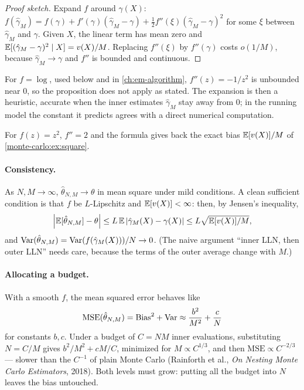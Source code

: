 \begin{notechapter}
\begin{proof}[Proof sketch]
Expand $f$ around $\gamma(X)$:
$f(\hat\gamma_M) = f(\gamma) + f'(\gamma)(\hat\gamma_M - \gamma) + \frac12f''(\xi)(\hat\gamma_M - \gamma)^2$
for some $\xi$ between $\hat\gamma_M$ and $\gamma$. Given $X$, the linear term
has mean zero and $\mathbb{E}[(\hat\gamma_M - \gamma)^2\mid X] = v(X)/M$. Replacing
$f''(\xi)$ by $f''(\gamma)$ costs $o(1/M)$, because $\hat\gamma_M\to\gamma$ and $f''$
is bounded and continuous.
\end{proof}

For $f = \log$, used below and in \cref{ch:em-algorithm}, $f''(z) = -1/z^2$ is unbounded near
$0$, so the proposition does not apply as stated. The expansion is then a heuristic, accurate
when the inner estimates $\hat\gamma_M$ stay away from $0$; in the running model the constant it
predicts agrees with a direct numerical computation.

For $f(z) = z^2$, $f'' = 2$ and the formula gives back the exact bias
$\mathbb{E}[v(X)]/M$ of \cref{monte-carlo:ex:square}.

\paragraph{Consistency.} As $N, M\to\infty$, $\hat\theta_{N,M}\to\theta$ in mean square
under mild conditions. A clean sufficient condition is that $f$ be $L$-Lipschitz
and $\mathbb{E}[v(X)]<\infty$: then, by Jensen's inequality,
\[
  \left|\mathbb{E}[\hat\theta_{N,M}] - \theta\right|\leq L\,\mathbb{E}\left|\hat\gamma_M(X) - \gamma(X)\right|\leq L\sqrt{\mathbb{E}[v(X)]/M},
\] and $\operatorname{Var}(\hat\theta_{N,M}) = \operatorname{Var}(f(\hat\gamma_M(X)))/N\to0$.
(The naive argument ``inner LLN, then outer LLN'' needs care, because the terms of
the outer average change with $M$.)

\paragraph{Allocating a budget.} With a smooth $f$, the mean squared error behaves like
\[
  \mathrm{MSE}(\hat\theta_{N,M}) = \mathrm{Bias}^2 + \operatorname{Var}\approx\frac{b^2}{M^2} + \frac{c}{N}
\]
for constants $b, c$. Under a budget of $C = NM$ inner evaluations, substituting
$N = C/M$ gives $b^2/M^2 + cM/C$, minimized for $M\propto C^{1/3}$, and then
$\mathrm{MSE}\propto C^{-2/3}$ --- slower than the $C^{-1}$ of plain Monte Carlo
(Rainforth et al., \emph{On Nesting Monte Carlo Estimators}, 2018). Both levels
must grow: putting all the budget into $N$ leaves the bias untouched.


\end{notechapter}
